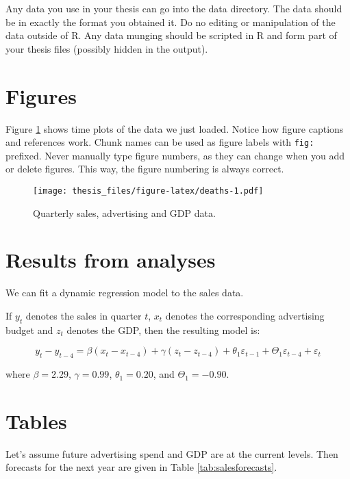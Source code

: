 \documentclass{sydneythesis}
\theoremstyle{definition}
\theoremstyle{definition}
\theoremstyle{definition}
\theoremstyle{remark}
\begin{document}
Any data you use in your thesis can go into the data directory. The data
should be in exactly the format you obtained it. Do no editing or
manipulation of the data outside of R. Any data munging should be
scripted in R and form part of your thesis files (possibly hidden in the
output).

\section{Figures}\label{figures}

Figure \ref{fig:deaths} shows time plots of the data we just loaded.
Notice how figure captions and references work. Chunk names can be used
as figure labels with \texttt{fig:} prefixed. Never manually type figure
numbers, as they can change when you add or delete figures. This way,
the figure numbering is always correct.

\begin{figure}
\centering
\texttt{[image: thesis\_files/figure-latex/deaths-1.pdf]}
\caption{\label{fig:deaths}Quarterly sales, advertising and GDP data.}
\end{figure}

\section{Results from analyses}\label{results-from-analyses}

We can fit a dynamic regression model to the sales data.

If \(y_t\) denotes the sales in quarter \(t\), \(x_t\) denotes the
corresponding advertising budget and \(z_t\) denotes the GDP, then the
resulting model is:

\begin{equation}
  y_t - y_{t-4} = \beta (x_t-x_{t-4}) + \gamma (z_t-z_{t-4}) + \theta_1 \varepsilon_{t-1} + \Theta_1 \varepsilon_{t-4} + \varepsilon_t
\end{equation}

where \(\beta = 2.29\), \(\gamma = 0.99\), \(\theta_1 = 0.20\), and
\(\Theta_1 = -0.90\).

\section{Tables}\label{tables}

Let's assume future advertising spend and GDP are at the current levels.
Then forecasts for the next year are given in Table
\ref{tab:salesforecasts}.
\end{document}
